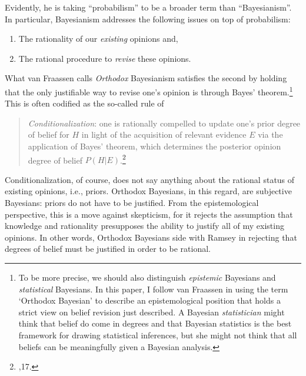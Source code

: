 Evidently, he is taking ``probabilism'' to be a broader term than
``Bayesianism''. In particular, Bayesianism addresses the following
issues on top of probabilism:

\begin{enumerate}
\tightlist
\item
  The rationality of our \emph{existing} opinions and,
\item
  The rational procedure to \emph{revise} these opinions.
\end{enumerate}

What van Fraassen calls \emph{Orthodox} Bayesianism satisfies the second
by holding that the only justifiable way to revise one's opinion is
through Bayes' theorem.\footnote{To be more precise, we should also
  distinguish \emph{epistemic} Bayesians and \emph{statistical}
  Bayesians. In this paper, I follow van Fraassen in using the term
  `Orthodox Bayesian' to describe an epistemological position that holds
  a strict view on belief revision just described. A Bayesian
  \emph{statistician} might think that belief do come in degrees and
  that Bayesian statistics is the best framework for drawing statistical
  inferences, but she might not think that all beliefs can be
  meaningfully given a Bayesian analysis.} This is often codified as the
so-called rule of

\begin{quote}
\emph{Conditionalization}: one is rationally compelled to update one's
prior degree of belief for \(H\) in light of the acquisition of relevant
evidence \(E\) via the application of Bayes' theorem, which determines
the posterior opinion degree of belief \(P(H|E)\).\footnote{\cite{beliefuly},17.}
\end{quote}

Conditionalization, of course, does not say anything about the rational
status of existing opinions, i.e., priors. Orthodox Bayesians, in this
regard, are subjective Bayesians: priors do not have to be justified.
From the epistemological perspective, this is a move against skepticism,
for it rejects the assumption that knowledge and rationality presupposes
the ability to justify all of my existing opinions. In other words,
Orthodox Bayesians side with Ramsey in rejecting that degrees of belief
must be justified in order to be rational.

